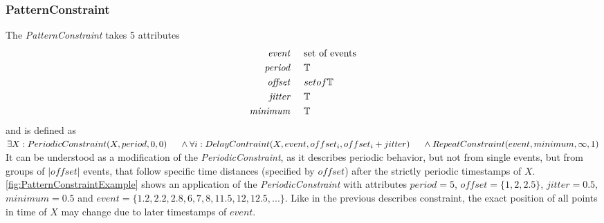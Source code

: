 		
	\subsubsection{PatternConstraint}
		The \emph{PatternConstraint} takes 5 attributes
		\begin{align*}
			\emph{event} 	& \hspace{.5cm}\text{set of events}\\
			\emph{period} 	& \hspace{.5cm}\mathbb{T}\\
			\emph{offset}	& \hspace{.5cm} set of \mathbb{T}\\
			\emph{jitter}	& \hspace{.5cm}\mathbb{T}\\
			\emph{minimum}	& \hspace{.5cm}\mathbb{T}
		\end{align*}
		and is defined as \\[10pt]
		\begin{math}
			\exists X: PeriodicConstraint(X, period, 0, 0)\\
			\text{\hspace{.5cm}} \land \forall i: DelayContraint(X, event, offset_i, offset_i+jitter)\\
			\text{\hspace{.5cm}} \land RepeatConstraint(event, minimum, \infty, 1)
		\end{math}\\[10pt]
		It can be understood as a modification of the \emph{PeriodicConstraint}, as it describes periodic behavior, but not from single events, but from groups of $|offset|$ events, that follow specific time distances (specified by $offset$) after the strictly periodic timestamps of $X$.\\
		\ref{fig:PatternConstraintExample} shows an application of the \emph{PeriodicConstraint} with attributes $period=5$, $offset=\{1, 2, 2.5\}$, $jitter=0.5$, $minimum=0.5$ and $event = \{1.2, 2.2, 2.8, 6, 7, 8, 11.5, 12, 12.5, ...\}$. Like in the previous describes constraint, the exact position of all points in time of $X$ may change due to later timestamps of $event$.
		
